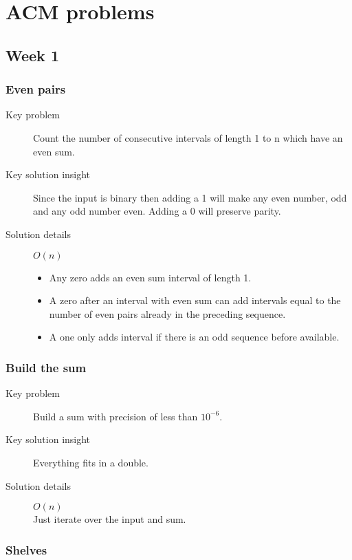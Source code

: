 \documentclass[11pt]{book}
\begin{document}
\chapter{ACM problems}

\section{Week 1}

\subsection{Even pairs}

\begin{description}
	\item[Key problem] Count the number of consecutive intervals of length 1 to n which have an even sum.
	\item[Key solution insight] Since the input is binary then adding a 1 will make any even number, odd and any odd number even. Adding a 0 will preserve parity.
	\item[Solution details] $O(n)$ \\
		\begin{itemize}
			\item Any zero adds an even sum interval of length 1.
			\item A zero after an interval with even sum can add intervals equal to the number of even pairs already in the preceding sequence.
			\item A one only adds interval if there is an odd sequence before available.
		\end{itemize}
\end{description}

\subsection{Build the sum}

\begin{description}
	\item[Key problem] Build a sum with precision of less than $10^{-6}$.
	\item[Key solution insight] Everything fits in a double.
	\item[Solution details] $O(n)$ \\ Just iterate over the input and sum.
\end{description}

\subsection{Shelves}
\end{document}
